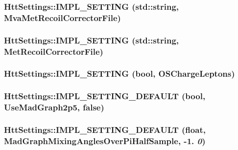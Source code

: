 \label{classHttSettings_a8cd0a1343cd2ae2b2e68fd148e41e59b}
\hypertarget{classHttSettings_a7523bd5520bf59a485cb19c11f6e902e}{
\subsubsection[{IMPL\_\-SETTING}]{\setlength{\rightskip}{0pt plus 5cm}HttSettings::IMPL\_\-SETTING (std::string, \/  MvaMetRecoilCorrectorFile)}}
\label{classHttSettings_a7523bd5520bf59a485cb19c11f6e902e}
\hypertarget{classHttSettings_a7702319e39e58d88570bb84ea577f208}{
\subsubsection[{IMPL\_\-SETTING}]{\setlength{\rightskip}{0pt plus 5cm}HttSettings::IMPL\_\-SETTING (std::string, \/  MetRecoilCorrectorFile)}}
\label{classHttSettings_a7702319e39e58d88570bb84ea577f208}
\hypertarget{classHttSettings_a36256b0f0115e6efd8cb86bb8a0a6b13}{
\subsubsection[{IMPL\_\-SETTING}]{\setlength{\rightskip}{0pt plus 5cm}HttSettings::IMPL\_\-SETTING (bool, \/  OSChargeLeptons)}}
\label{classHttSettings_a36256b0f0115e6efd8cb86bb8a0a6b13}
\hypertarget{classHttSettings_aa918600ec8b73732b5a6432fef753e34}{
\subsubsection[{IMPL\_\-SETTING\_\-DEFAULT}]{\setlength{\rightskip}{0pt plus 5cm}HttSettings::IMPL\_\-SETTING\_\-DEFAULT (bool, \/  UseMadGraph2p5, \/  false)}}
\label{classHttSettings_aa918600ec8b73732b5a6432fef753e34}
\hypertarget{classHttSettings_a590977f27bcdf90a9ff244eb663a02c9}{
\subsubsection[{IMPL\_\-SETTING\_\-DEFAULT}]{\setlength{\rightskip}{0pt plus 5cm}HttSettings::IMPL\_\-SETTING\_\-DEFAULT (float, \/  MadGraphMixingAnglesOverPiHalfSample, \/  -\/1. {\em 0})}}
